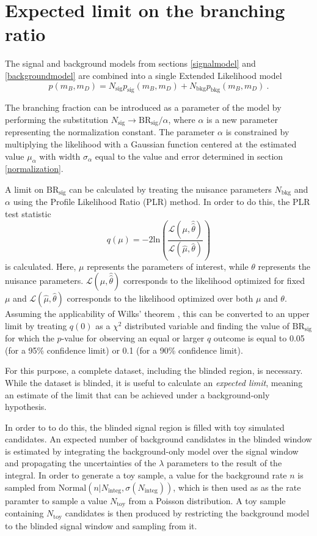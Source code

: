 \section{Expected limit on the branching ratio}

The signal and background models from sections \ref{signalmodel} and \ref{backgroundmodel} are combined into a single Extended Likelihood model
\begin{equation}
  p(m_B, m_D) = N_\text{sig} p_\text{sig}(m_B, m_D) + N_\text{bkg} p_\text{bkg}(m_B, m_D)\:.
\end{equation}

The branching fraction can be introduced as a parameter of the model by performing the substitution $N_\text{sig}\to \text{BR}_\text{sig}/\alpha$, where $\alpha$ is a new parameter representing the normalization constant.
The parameter $\alpha$ is constrained by multiplying the likelihood with a Gaussian function centered at the estimated value $\mu_\alpha$ with width $\sigma_\alpha$ equal to the value and error determined in section \ref{normalization}.

A limit on $\text{BR}_\text{sig}$ can be calculated by treating the nuisance parameters $N_\text{bkg}$ and $\alpha$ using the Profile Likelihood Ratio (PLR) method.
In order to do this, the PLR test statistic
\begin{equation}
  q(μ) = -2\mathup{ln}\left(\frac{\mathcal{L}(μ,\hat{\hat{θ}})}{\mathcal{L}(\hat{μ},\hat{θ})}\right)
\end{equation}
is calculated.
Here, $μ$ represents the parameters of interest, while $\theta$ represents the nuisance parameters.
$\mathcal{L}(μ, \hat{\hat{θ}})$ corresponds to the likelihood optimized for fixed $μ$ and $\mathcal{L}(\hat{μ},\hat{θ})$ corresponds to the likelihood optimized over both $μ$ and $θ$.
Assuming the applicability of Wilks' theorem \cite{Wilks}, this can be converted to an upper limit by treating $q(0)$ as a $\chi^2$ distributed variable and finding the value of $\text{BR}_\text{sig}$ for which the $p$-value for observing an equal or larger $q$ outcome is equal to 0.05 (for a 95\% confidence limit) or 0.1 (for a 90\% confidence limit).

For this purpose, a complete dataset, including the blinded region, is necessary.
While the dataset is blinded, it is useful to calculate an \emph{expected limit}, meaning an estimate of the limit that can be achieved under a background-only hypothesis.

In order to to do this, the blinded signal region is filled with toy simulated candidates.
An expected number of background candidates in the blinded window is estimated by integrating the background-only model over the signal window and propagating the uncertainties of the $\lambda$ parameters to the result of the integral.
In order to generate a toy sample, a value for the background rate $n$ is sampled from $\mathup{Normal}\left(n|N_\text{integ}, \sigma(N_\text{integ})\right)$, which is then used as as the rate paramter to sample a value $N_\text{toy}$ from a Poisson distribution.
A toy sample containing $N_\text{toy}$ candidates is then produced by restricting the background model to the blinded signal window and sampling from it.

